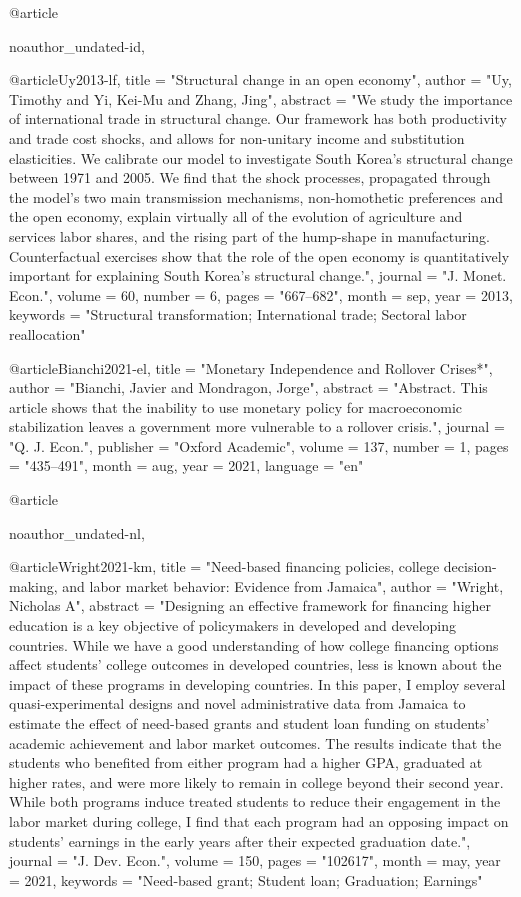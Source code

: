 {@article{noauthor_undated-id,
	
}

@article{Uy2013-lf,
	title    = "Structural change in an open economy",
	author   = "Uy, Timothy and Yi, Kei-Mu and Zhang, Jing",
	abstract = "We study the importance of international trade in structural
	change. Our framework has both productivity and trade cost
	shocks, and allows for non-unitary income and substitution
	elasticities. We calibrate our model to investigate South Korea's
	structural change between 1971 and 2005. We find that the shock
	processes, propagated through the model's two main transmission
	mechanisms, non-homothetic preferences and the open economy,
	explain virtually all of the evolution of agriculture and
	services labor shares, and the rising part of the hump-shape in
	manufacturing. Counterfactual exercises show that the role of the
	open economy is quantitatively important for explaining South
	Korea's structural change.",
	journal  = "J. Monet. Econ.",
	volume   =  60,
	number   =  6,
	pages    = "667--682",
	month    =  sep,
	year     =  2013,
	keywords = "Structural transformation; International trade; Sectoral labor
	reallocation"
}

@article{Bianchi2021-el,
	title     = "Monetary Independence and Rollover Crises*",
	author    = "Bianchi, Javier and Mondragon, Jorge",
	abstract  = "Abstract. This article shows that the inability to use monetary
	policy for macroeconomic stabilization leaves a government more
	vulnerable to a rollover crisis.",
	journal   = "Q. J. Econ.",
	publisher = "Oxford Academic",
	volume    =  137,
	number    =  1,
	pages     = "435--491",
	month     =  aug,
	year      =  2021,
	language  = "en"
}

@article{noauthor_undated-nl,
	
}

@article{Wright2021-km,
	title    = "Need-based financing policies, college decision-making, and labor
	market behavior: Evidence from Jamaica",
	author   = "Wright, Nicholas A",
	abstract = "Designing an effective framework for financing higher education
	is a key objective of policymakers in developed and developing
	countries. While we have a good understanding of how college
	financing options affect students' college outcomes in developed
	countries, less is known about the impact of these programs in
	developing countries. In this paper, I employ several
	quasi-experimental designs and novel administrative data from
	Jamaica to estimate the effect of need-based grants and student
	loan funding on students' academic achievement and labor market
	outcomes. The results indicate that the students who benefited
	from either program had a higher GPA, graduated at higher rates,
	and were more likely to remain in college beyond their second
	year. While both programs induce treated students to reduce their
	engagement in the labor market during college, I find that each
	program had an opposing impact on students' earnings in the early
	years after their expected graduation date.",
	journal  = "J. Dev. Econ.",
	volume   =  150,
	pages    = "102617",
	month    =  may,
	year     =  2021,
	keywords = "Need-based grant; Student loan; Graduation; Earnings"
}

}
